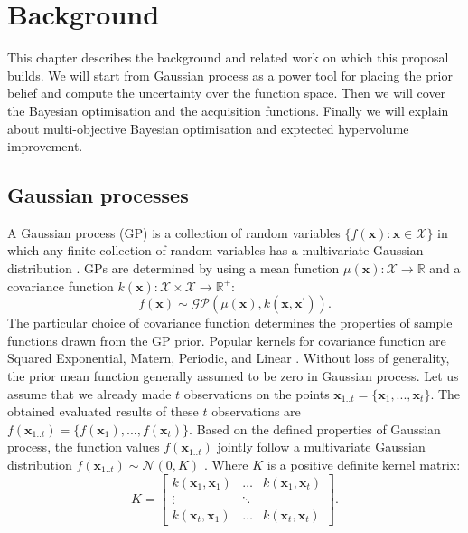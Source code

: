 \chapter{Background}
This chapter describes the background and related work on which this proposal builds.
We will start from Gaussian process as a power tool for placing the prior belief and compute the uncertainty over the function space. Then we will cover the  Bayesian optimisation and the acquisition functions. Finally we will explain about multi-objective Bayesian optimisation and exptected hypervolume improvement.

\section{Gaussian processes}
A Gaussian process (GP) is a collection of random variables $\{f(\textbf{x}) : \textbf{x} \in \mathcal{X}\}$ in which any finite collection of random variables has a multivariate
Gaussian distribution \cite{rasmussen2006gaussian}. GPs are determined by using a mean function $\mu(\textbf{x}): \mathcal{X} \rightarrow \mathbb{R}$ and 
a covariance function $k(\textbf{x}): \mathcal{X} \times \mathcal{X} \rightarrow \mathbb{R}^+$:
\begin{equation}
f(\textbf{x}) \sim \mathcal{GP}(\mu(\textbf{x}),k(\textbf{x},\textbf{x}^{\prime})).
\end{equation}
The particular choice of covariance function determines the properties of sample functions drawn from the GP prior.
Popular kernels for covariance function are Squared Exponential, Matern, Periodic, and Linear \cite{wilson2013gaussian}. 
Without loss of generality, the prior mean function generally assumed to be zero in Gaussian process.
Let us assume that we already made $t$ observations on the points $\textbf{x}_{1..t} = \{\textbf{x}_1,...,\textbf{x}_t\}$. The obtained evaluated results of these $t$ observations are $f(\textbf{x}_{1..t}) = \{f(\textbf{x}_1),...,f(\textbf{x}_t)\}$. Based on the defined properties of Gaussian process, the function values  $f(\textbf{x}_{1..t})$ jointly follow a multivariate Gaussian distribution $f(\textbf{x}_{1..t}) \sim \mathcal{N}(0,K)$ \cite{li2017rapid}. Where $K$ is a positive definite kernel matrix:
\[
K = \begin{bmatrix} 
    k(\textbf{x}_1,\textbf{x}_1) & \dots & k(\textbf{x}_1,\textbf{x}_t)\\
    \vdots & \ddots  \\
    k(\textbf{x}_t,\textbf{x}_1) & \dots  & k(\textbf{x}_t,\textbf{x}_t)
    \end{bmatrix}.
\]
